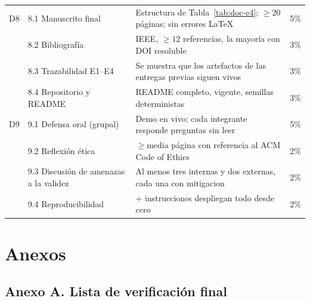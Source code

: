 \documentclass[11pt,a4paper]{article}
\begin{document}
\begin{xltabular}{\linewidth}{@{}p{0.9cm} p{4.6cm} X p{1cm}@{}}
        D8 & 8.1 Manuscrito final & Estructura de Tabla~\ref{tab:doc-e4}; $\ge 20$ páginas; sin errores LaTeX & 5\%\\
           & 8.2 Bibliografía & IEEE, $\ge 12$ referencias, la mayoría con DOI resoluble & 3\%\\
           & 8.3 Trazabilidad E1--E4 & Se muestra que los artefactos de las entregas previas siguen vivos & 3\%\\
           & 8.4 Repositorio y README & README completo,  vigente, semillas deterministas & 3\%\\
        D9 & 9.1 Defensa oral (grupal) & Demo en vivo; cada integrante responde preguntas sin leer & 5\%\\
           & 9.2 Reflexión ética & $\ge {}$media página con referencia al ACM Code of Ethics~\cite{ACMCode2018} & 2\%\\
           & 9.3 Discusión de amenazas a la validez & Al menos tres internas y dos externas, cada una con mitigacion & 2\%\\
           & 9.4 Reproducibilidad &  + instrucciones despliegan todo desde cero & 2\%\\
    \end{xltabular}
    \normalsize

\section{Anexos}

\subsection*{Anexo A. Lista de verificación final}
\end{document}
